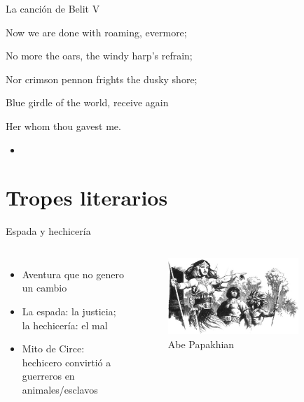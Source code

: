 \begin{frame}{La canción de Belit V}
	\begin{exampleblock}{}
		Now we are done with roaming, evermore;

		No more the oars, the windy harp’s refrain;

		Nor crimson pennon frights the dusky shore;

		Blue girdle of the world, receive again

		Her whom thou gavest me.
	\end{exampleblock}

	\begin{itemize}
		\item \textit{  }
	\end{itemize}
\end{frame}
\note[itemize]{
	\item
}

\section{Tropes literarios}
\note[itemize]{
	\item
}

\begin{frame}{Espada y hechicería}
	\begin{columns}
		\begin{itemize}
			\item Aventura que no genero un cambio
			\item La espada: la justicia; la hechicería: el mal
			\item Mito de Circe: hechicero convirtió a guerreros en animales/esclavos
		\end{itemize}
		\begin{figure}[htb]
			\centering
			\includegraphics[width=0.8\textwidth]{img/tributos/elephant07}
			\caption{Abe Papakhian}
		\end{figure}
	\end{columns}
\end{frame}
\note[itemize]{
	\item
}

